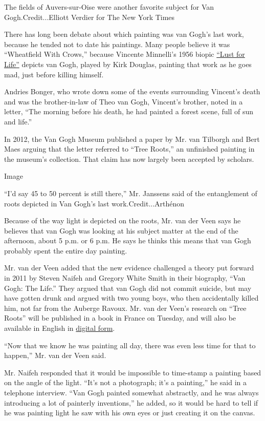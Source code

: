The fields of Auvers-sur-Oise were another favorite subject for Van
Gogh.Credit...Elliott Verdier for The New York Times

There has long been debate about which painting was van Gogh's last
work, because he tended not to date his paintings. Many people believe
it was ``Wheatfield With Crows,'' because Vincente Minnelli's 1956
biopic \href{https://www.imdb.com/title/tt0049456/}{``Lust for Life''}
depicts van Gogh, played by Kirk Douglas, painting that work as he goes
mad, just before killing himself.

Andries Bonger, who wrote down some of the events surrounding Vincent's
death and was the brother-in-law of Theo van Gogh, Vincent's brother,
noted in a letter, ``The morning before his death, he had painted a
forest scene, full of sun and life.''

In 2012, the Van Gogh Museum published a paper by Mr. van Tilborgh and
Bert Maes arguing that the letter referred to ``Tree Roots,'' an
unfinished painting in the museum's collection. That claim has now
largely been accepted by scholars.

Image

``I'd say 45 to 50 percent is still there,'' Mr. Janssens said of the
entanglement of roots depicted in Van Gogh's last work.Credit...Arthénon

Because of the way light is depicted on the roots, Mr. van der Veen says
he believes that van Gogh was looking at his subject matter at the end
of the afternoon, about 5 p.m. or 6 p.m. He says he thinks this means
that van Gogh probably spent the entire day painting.

Mr. van der Veen added that the new evidence challenged a theory put
forward in 2011 by Steven Naifeh and Gregory White Smith in their
biography, ``Van Gogh: The Life.'' They argued that van Gogh did not
commit suicide, but may have gotten drunk and argued with two young
boys, who then accidentally killed him, not far from the Auberge Ravoux.
Mr. van der Veen's research on ``Tree Roots'' will be published in a
book in France on Tuesday, and will also be available in English in
\href{http://www.arthenon.com/roots}{digital form}.

``Now that we know he was painting all day, there was even less time for
that to happen,'' Mr. van der Veen said.

Mr. Naifeh responded that it would be impossible to time-stamp a
painting based on the angle of the light. ``It's not a photograph; it's
a painting,'' he said in a telephone interview. ``Van Gogh painted
somewhat abstractly, and he was always introducing a lot of painterly
inventions,'' he added, so it would be hard to tell if he was painting
light he saw with his own eyes or just creating it on the canvas.

